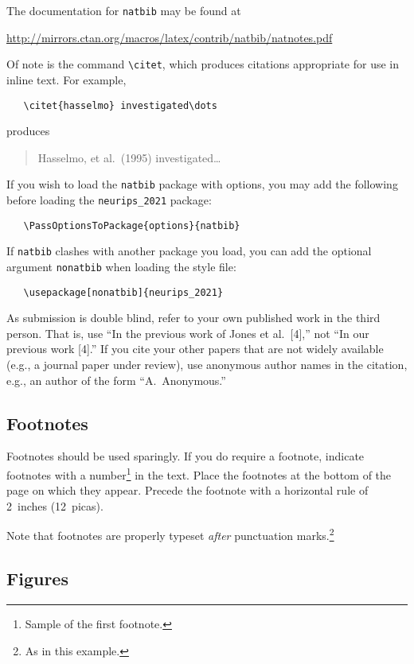 \documentclass{article}
\begin{document}
The documentation for \verb+natbib+ may be found at
\begin{center}
  \url{http://mirrors.ctan.org/macros/latex/contrib/natbib/natnotes.pdf}
\end{center}
Of note is the command \verb+\citet+, which produces citations appropriate for
use in inline text.  For example,
\begin{verbatim}
   \citet{hasselmo} investigated\dots
\end{verbatim}
produces
\begin{quote}
  Hasselmo, et al.\ (1995) investigated\dots
\end{quote}

If you wish to load the \verb+natbib+ package with options, you may add the
following before loading the \verb+neurips_2021+ package:
\begin{verbatim}
   \PassOptionsToPackage{options}{natbib}
\end{verbatim}

If \verb+natbib+ clashes with another package you load, you can add the optional
argument \verb+nonatbib+ when loading the style file:
\begin{verbatim}
   \usepackage[nonatbib]{neurips_2021}
\end{verbatim}

As submission is double blind, refer to your own published work in the third
person. That is, use ``In the previous work of Jones et al.\ [4],'' not ``In our
previous work [4].'' If you cite your other papers that are not widely available
(e.g., a journal paper under review), use anonymous author names in the
citation, e.g., an author of the form ``A.\ Anonymous.''

\subsection{Footnotes}

Footnotes should be used sparingly.  If you do require a footnote, indicate
footnotes with a number\footnote{Sample of the first footnote.} in the
text. Place the footnotes at the bottom of the page on which they appear.
Precede the footnote with a horizontal rule of 2~inches (12~picas).

Note that footnotes are properly typeset \emph{after} punctuation
marks.\footnote{As in this example.}

\subsection{Figures}
\end{document}
